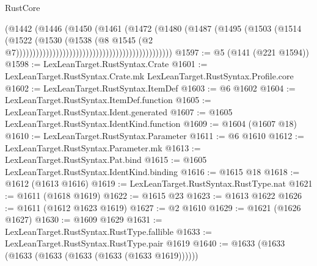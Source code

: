 \begin{lexlean}{RustCore}
\begin{coremodule}
                                                                    (@1442
                                                                      (@1446
                                                                        (@1450
                                                                          (@1461
                                                                            (@1472
                                                                              (@1480
                                                                                (@1487
                                                                                  (@1495
                                                                                    (@1503
                                                                                      (@1514
                                                                                        (@1522
                                                                                          (@1530
                                                                                            (@1538
                                                                                              (@8
                                                                                                @1545
                                                                                                (@2
                                                                                                  @7)))))))))))))))))))))))))))))))))))))))))))))))
@1597 := @5 (@141 (@221 @1594))
@1598 := LexLeanTarget.RustSyntax.Crate
@1601 := LexLeanTarget.RustSyntax.Crate.mk LexLeanTarget.RustSyntax.Profile.core
@1602 := LexLeanTarget.RustSyntax.ItemDef
@1603 := @6 @1602
@1604 := LexLeanTarget.RustSyntax.ItemDef.function
@1605 := LexLeanTarget.RustSyntax.Ident.generated
@1607 := @1605 LexLeanTarget.RustSyntax.IdentKind.function
@1609 := @1604 (@1607 @18)
@1610 := LexLeanTarget.RustSyntax.Parameter
@1611 := @6 @1610
@1612 := LexLeanTarget.RustSyntax.Parameter.mk
@1613 := LexLeanTarget.RustSyntax.Pat.bind
@1615 := @1605 LexLeanTarget.RustSyntax.IdentKind.binding
@1616 := @1615 @18
@1618 := @1612 (@1613 @1616)
@1619 := LexLeanTarget.RustSyntax.RustType.nat
@1621 := @1611 (@1618 @1619)
@1622 := @1615 @23
@1623 := @1613 @1622
@1626 := @1611 (@1612 @1623 @1619)
@1627 := @2 @1610
@1629 := @1621 (@1626 @1627)
@1630 := @1609 @1629
@1631 := LexLeanTarget.RustSyntax.RustType.fallible
@1633 := LexLeanTarget.RustSyntax.RustType.pair @1619
@1640 := @1633 (@1633 (@1633 (@1633 (@1633 (@1633 (@1633 @1619))))))

\end{coremodule}
\end{lexlean}
